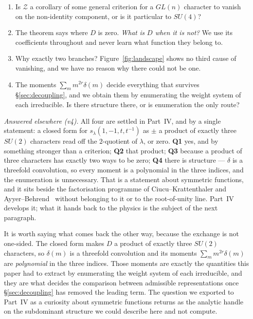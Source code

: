 \documentclass[11pt,a4paper]{article}
\newcommand{\su}[1]{SU(#1)}
\begin{document}
\begin{enumerate}\itemsep2pt
\item[\textbf{Q1}] Is $\mathcal Z$ a corollary of some general criterion for a $GL(n)$ character
to vanish on the non-identity component, or is it particular to $\su4$?
\item[\textbf{Q2}] The theorem says where $D$ is zero. \emph{What is $D$ when it is not?} We use
its coefficients throughout and never learn what function they belong to.
\item[\textbf{Q3}] Why exactly two branches? Figure~\ref{fig:landscape} shows no third cause of
vanishing, and we have no reason why there could not be one.
\item[\textbf{Q4}] The moments $\sum_m m^{2r}\delta(m)$ decide everything that survives
\S\ref{sec:decoupling}, and we obtain them by enumerating the weight system of each irreducible.
Is there structure there, or is enumeration the only route?
\end{enumerate}

\emph{Answered elsewhere (v4).} All four are settled in Part~IV, and by a single statement: a
closed form for $s_\lambda(1,-1,t,t^{-1})$ as $\pm$ a product of exactly three $SU(2)$
characters read off the $2$-quotient of $\lambda$, or zero. \textbf{Q1} yes, and by something
stronger than a criterion; \textbf{Q2} that product; \textbf{Q3} because a product of three
characters has exactly two ways to be zero; \textbf{Q4} there is structure --- $\delta$ is a
threefold convolution, so every moment is a polynomial in the three indices, and the enumeration
is unnecessary. That is a statement about symmetric functions, and it sits beside the factorisation
programme of Ciucu--Krattenthaler and Ayyer--Behrend~\cite{CiucuKrattenthaler,AyyerBehrend}
without belonging to it or to the root-of-unity line. Part~IV develops it; what it hands back to
the physics is the subject of the next paragraph.

It is worth saying what comes back the other way, because the exchange is not one-sided. The
closed form makes $D$ a product of exactly three $SU(2)$ characters, so $\delta(m)$ is a
threefold convolution and its moments $\sum_m m^{2r}\delta(m)$ are \emph{polynomial} in the
three indices. Those moments are exactly the quantities this paper had to extract by
enumerating the weight system of each irreducible, and they are what decides the comparison
between admissible representations once \S\ref{sec:decoupling} has removed the leading term.
The question we exported to Part~IV as a curiosity about symmetric functions returns as the
analytic handle on the subdominant structure we could describe here and not compute.
\end{document}
